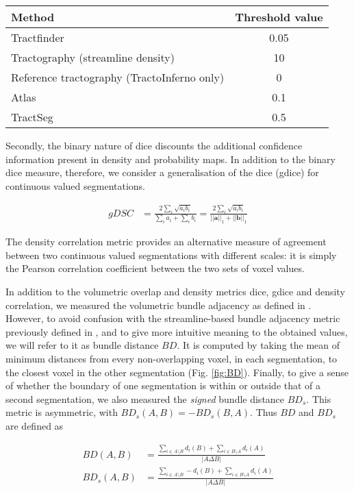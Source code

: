 \begin{tabularx}{0.5\textwidth}{X c}
  Method    & Threshold value \\
  \hline
  Tractfinder   & 0.05 \\
  Tractography (streamline density)  & 10 \\
  Reference tractography (TractoInferno only) & 0 \\
  Atlas         & 0.1 \\
  TractSeg      & 0.5 \\
  \hline
\end{tabularx}

Secondly, the binary nature of \gls{dice} discounts the additional confidence information present in density and probability maps.
In addition to the binary \gls{dice} measure, therefore, we consider a generalisation of the \gls{dice} (\gls{gdice}) for continuous valued segmentations.

\begin{align}
  gDSC &= \frac{2 \sum_i \sqrt{a_ib_i} }{\sum_ia_i + \sum_ib_i}
   =  \frac{2 \sum_i \sqrt{a_ib_i} }{||\mathbf{a}||_1 + ||\mathbf{b}||_1}
\end{align}

The density correlation metric provides an alternative measure of agreement between two continuous valued segmentations with different scales:
it is simply the Pearson correlation coefficient between the two sets of voxel values.

In addition to the volumetric overlap and density metrics \gls{dice}, \gls{gdice} and density correlation, we measured the volumetric bundle adjacency as defined in \textcite{Schilling2021a}.
However, to avoid confusion with the streamline-based bundle adjacency\autocite{Radwan2022, Garyfallidis2012, Rheault2022} metric previously defined in \textcite{Garyfallidis2012},
and to give more intuitive meaning to the obtained values, we will refer to it as bundle distance $BD$.
It is computed by taking the mean of minimum distances from every non-overlapping voxel, in each segmentation, to the closest voxel in the other segmentation (Fig. \ref{fig:BD}).
Finally, to give a sense of whether the boundary of one segmentation is within or outside that of a second segmentation, we also measured the \textit{signed} bundle distance $BD_s$.
This metric is asymmetric, with $BD_s (A,B) = -BD_s(B,A)$.
Thus $BD$ and $BD_s$ are defined as

\begin{align}
  BD(A,B) &= \frac{\sum_{i \in A\setminus B} d_i(B) + \sum_{i \in B\setminus A} d_i(A)}{|A\Delta B|} \label{eq:bd} \\
  BD_s(A,B) &= \frac{\sum_{i \in A\setminus B} - d_i(B) + \sum_{i \in B\setminus A} d_i(A)}{|A\Delta B|} \label{eq:bds}
\end{align}

